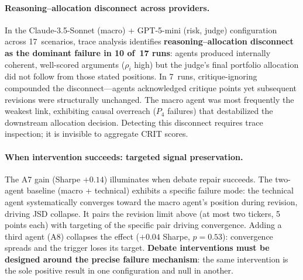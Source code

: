\documentclass{article}
\begin{document}
\paragraph{Reasoning--allocation disconnect across providers.}
In the Claude-3.5-Sonnet (macro) + GPT-5-mini (risk, judge) configuration across 17~scenarios, trace analysis identifies \textbf{reasoning--allocation disconnect as the dominant failure in 10 of~17 runs}: agents produced internally coherent, well-scored arguments ($\rho_i$ high) but the judge's final portfolio allocation did not follow from those stated positions. In 7~runs, critique-ignoring compounded the disconnect---agents acknowledged critique points yet subsequent revisions were structurally unchanged. The macro agent was most frequently the weakest link, exhibiting causal overreach ($P_4$ failures) that destabilized the downstream allocation decision. Detecting this disconnect requires trace inspection; it is invisible to aggregate CRIT scores.

\paragraph{When intervention succeeds: targeted signal preservation.}
The A7 gain (Sharpe $+0.14$) illuminates when debate repair succeeds. The two-agent baseline (macro + technical) exhibits a specific failure mode: the technical agent systematically converges toward the macro agent's position during revision, driving JSD collapse. It pairs the revision limit above (at most two tickers, 5 points each) with targeting of the specific pair driving convergence. Adding a third agent (A8) collapses the effect ($+0.04$ Sharpe, $p=0.53$): convergence spreads and the trigger loses its target. \textbf{Debate interventions must be designed around the precise failure mechanism}: the same intervention is the sole positive result in one configuration and null in another.

\end{document}
